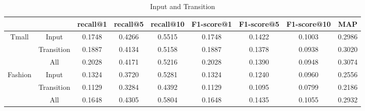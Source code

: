\documentclass[conference]{IEEEtran}
\begin{document}
\begin{table}[htbp]
\centering\scriptsize
\caption{Input and Transition}
\begin{tabular}{ccccccccc}
    \toprule
          &  & recall@1 & recall@5 & recall@10 & F1-score@1 & F1-score@5 & F1-score@10 & MAP   \\
    \midrule
    \multirow{3}[0]{*}{Tmall} 
        &Input   &0.1748 &0.4266 & 0.5515  &0.1748  &0.1422  &0.1003  &0.2986   \\
        &Transition  &0.1887 & 0.4134  &0.5158&  0.1887& 0.1378  &0.0938&  0.3020   \\
        &All &0.2028  &0.4171  &0.5216  &0.2028  &0.1390  &0.0948 & 0.3074\\
    \midrule
    \multirow{3}[0]{*}{Fashion} 
        &Input   &0.1324  &0.3720  &0.5281  &0.1324  &0.1240 & 0.0960  &0.2556   \\
        &Transition  &0.1129  &0.3284  &0.4392  &0.1129  &0.1095  &0.0799  &0.2186   \\
        &All &0.1648  &0.4305  &0.5804  &0.1648 & 0.1435&  0.1055  &0.2932\\
    \bottomrule
\end{tabular}%
\label{tab:InputAndTransition}%
\end{table}%
\end{document}
